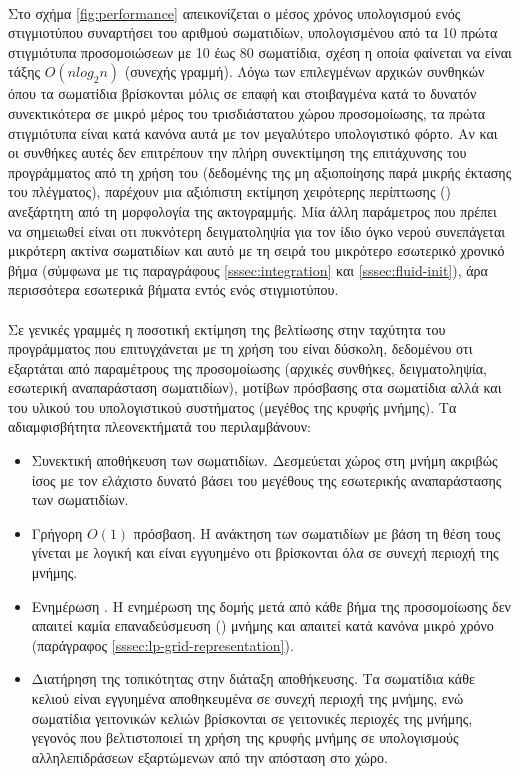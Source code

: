 \paragraph{} Στο σχήμα \ref{fig:performance} απεικονίζεται ο μέσος χρόνος υπολογισμού ενός
στιγμιοτύπου  συναρτήσει του αριθμού σωματιδίων, υπολογισμένου από τα 10 πρώτα
στιγμιότυπα προσομοιώσεων με 10 έως 80 σωματίδια, σχέση η οποία φαίνεται να
είναι τάξης $O(n log_2n)$ (συνεχής γραμμή). Λόγω των επιλεγμένων αρχικών συνθηκών όπου τα
σωματίδια βρίσκονται μόλις σε επαφή και στοιβαγμένα κατά το δυνατόν συνεκτικότερα σε μικρό
μέρος του τρισδιάστατου χώρου προσομοίωσης, τα πρώτα στιγμιότυπα είναι κατά κανόνα αυτά με
τον μεγαλύτερο υπολογιστικό φόρτο. Αν και οι συνθήκες αυτές δεν επιτρέπουν την πλήρη
συνεκτίμηση της επιτάχυνσης του προγράμματος από τη χρήση του  (δεδομένης της
μη αξιοποίησης παρά μικρής έκτασης του πλέγματος), παρέχουν μια αξιόπιστη εκτίμηση
χειρότερης περίπτωσης () ανεξάρτητη από τη μορφολογία της ακτογραμμής. Μία
άλλη παράμετρος που πρέπει να σημειωθεί είναι οτι πυκνότερη δειγματοληψία για τον ίδιο
όγκο νερού συνεπάγεται μικρότερη ακτίνα σωματιδίων και αυτό με τη σειρά του μικρότερο
εσωτερικό χρονικό βήμα (σύμφωνα με τις παραγράφους \ref{sssec:integration} και
\ref{sssec:fluid-init}), άρα περισσότερα εσωτερικά βήματα εντός ενός στιγμιοτύπου.

\paragraph{} Σε γενικές γραμμές η ποσοτική εκτίμηση της βελτίωσης στην ταχύτητα του
προγράμματος που επιτυγχάνεται με τη χρήση του  είναι δύσκολη, δεδομένου οτι
εξαρτάται από παραμέτρους της προσομοίωσης (αρχικές συνθήκες, δειγματοληψία, εσωτερική
αναπαράσταση σωματιδίων), μοτίβων πρόσβασης στα σωματίδια αλλά και του υλικού του
υπολογιστικού συστήματος (μεγέθος της κρυφής μνήμης). Τα αδιαμφισβήτητα πλεονεκτήματά του
περιλαμβάνουν:
\begin{itemize}
\item Συνεκτική αποθήκευση των σωματιδίων. Δεσμεύεται χώρος στη μνήμη ακριβώς ίσος με τον
  ελάχιστο δυνατό βάσει του μεγέθους της εσωτερικής αναπαράστασης των σωματιδίων.
\item Γρήγορη $Ο(1)$ πρόσβαση. Η ανάκτηση των σωματιδίων με βάση τη θέση τους γίνεται με
  λογική  και είναι εγγυημένο οτι βρίσκονται όλα σε συνεχή περιοχή της
  μνήμης.
\item Ενημέρωση . Η ενημέρωση της δομής μετά από κάθε βήμα της προσομοίωσης
  δεν απαιτεί καμία επαναδεύσμευση () μνήμης και απαιτεί κατά κανόνα
  μικρό χρόνο (παράγραφος \ref{sssec:lp-grid-representation}).
\item Διατήρηση της τοπικότητας στην διάταξη αποθήκευσης. Τα σωματίδια κάθε κελιού είναι
  εγγυημένα αποθηκευμένα σε συνεχή περιοχή της μνήμης, ενώ σωματίδια γειτονικών κελιών
  βρίσκονται σε γειτονικές περιοχές της μνήμης, γεγονός που βελτιστοποιεί τη χρήση της
  κρυφής μνήμης σε υπολογισμούς αλληλεπιδράσεων εξαρτώμενων από την απόσταση στο χώρο.
\end{itemize}


